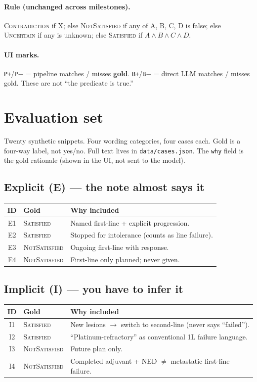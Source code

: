 \documentclass[11pt,a4paper]{article}
\newcommand{\sat}{\textsc{Satisfied}}
\newcommand{\nsat}{\textsc{NotSatisfied}}
\newcommand{\unc}{\textsc{Uncertain}}
\newcommand{\con}{\textsc{Contradiction}}
\begin{document}
\paragraph{Rule (unchanged across milestones).}
\con{} if X;
else \nsat{} if any of A, B, C, D is false;
else \unc{} if any is unknown;
else \sat{} if $A \land B \land C \land D$.

\paragraph{UI marks.}
\texttt{P+}/\texttt{P$-$} = pipeline matches / misses \textbf{gold}.
\texttt{B+}/\texttt{B$-$} = direct LLM matches / misses gold.
These are not ``the predicate is true.''

\section{Evaluation set}

Twenty synthetic snippets. Four wording categories, four cases each. Gold is a four-way label, not yes/no.
Full text lives in \texttt{data/cases.json}. The \texttt{why} field is the gold rationale (shown in the UI, not sent to the model).

\subsection{Explicit (E) --- the note almost says it}

\begin{tabularx}{\textwidth}{@{}c l Y@{}}
\toprule
ID & Gold & Why included \\
\midrule
E1 & \sat & Named first-line + explicit progression. \\
E2 & \sat & Stopped for intolerance (counts as line failure). \\
E3 & \nsat & Ongoing first-line with response. \\
E4 & \nsat & First-line only planned; never given. \\
\bottomrule
\end{tabularx}

\subsection{Implicit (I) --- you have to infer it}

\begin{tabularx}{\textwidth}{@{}c l Y@{}}
\toprule
ID & Gold & Why included \\
\midrule
I1 & \sat & New lesions $\rightarrow$ switch to second-line (never says ``failed''). \\
I2 & \sat & ``Platinum-refractory'' as conventional 1L failure language. \\
I3 & \nsat & Future plan only. \\
I4 & \nsat & Completed adjuvant + NED $\neq$ metastatic first-line failure. \\
\bottomrule
\end{tabularx}
\end{document}

